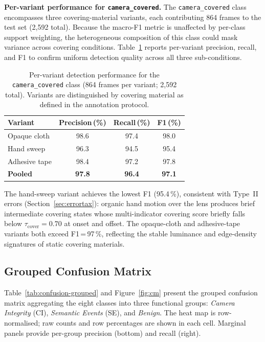 \documentclass[a4paper,fleqn]{cas-dc}
\begin{document}
\textbf{Per-variant performance for \texttt{camera\_covered}.}
The \texttt{camera\_covered} class encompasses three covering-material
variants, each contributing 864 frames to the test set (2{,}592 total).
Because the macro-F1 metric is unaffected by per-class support weighting,
the heterogeneous composition of this class could mask variance across
covering conditions. Table~\ref{tab:covered-variants} reports per-variant
precision, recall, and F1 to confirm uniform detection quality across all
three sub-conditions.
 
\begin{table}[!ht]
\caption{Per-variant detection performance for the \texttt{camera\_covered}
class (864 frames per variant; 2{,}592 total). Variants are distinguished
by covering material as defined in the annotation protocol.}
\label{tab:covered-variants}
\centering\small\setlength{\tabcolsep}{6pt}
\begin{tabular}{lccc}
\toprule
\textbf{Variant} & \textbf{Precision\,(\%)} & \textbf{Recall\,(\%)} & \textbf{F1\,(\%)} \\
\midrule
Opaque cloth      & 98.6 & 97.4 & 98.0 \\
Hand sweep        & 96.3 & 94.5 & 95.4 \\
Adhesive tape     & 98.4 & 97.2 & 97.8 \\
\midrule
\textbf{Pooled}   & \textbf{97.8} & \textbf{96.4} & \textbf{97.1} \\
\bottomrule
\end{tabular}
\end{table}
 
The hand-sweep variant achieves the lowest F1 (95.4\,\%), consistent with
Type~II errors (Section~\ref{sec:errortax}): organic hand motion over the
lens produces brief intermediate covering states whose multi-indicator
covering score briefly falls below $\tau_{\text{cover}} = 0.70$ at onset
and offset. The opaque-cloth and adhesive-tape variants both exceed F1\,=\,97\,\%,
reflecting the stable luminance and edge-density signatures of static
covering materials.
 
\FloatBarrier
\subsection{Grouped Confusion Matrix}
\label{sec:cm}
 
Table~\ref{tab:confusion-grouped} and Figure~\ref{fig:cm} present the
grouped confusion matrix aggregating the eight classes into three functional
groups: \emph{Camera Integrity} (CI), \emph{Semantic Events} (SE), and
\emph{Benign}. The heat map is row-normalised; raw counts and row percentages
are shown in each cell. Marginal panels provide per-group precision (bottom)
and recall (right).
 
\end{document}
